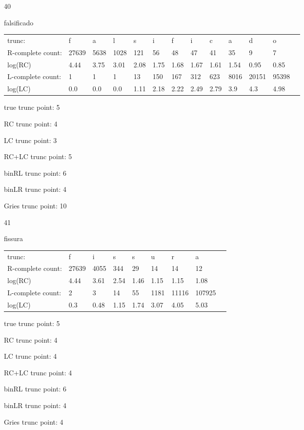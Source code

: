 \documentclass[10pt]{article}
\begin{document}
\vspace{1em}

40

falsificado

\begin{tabular}{l|llllllllllll}
trunc: & f & a & l & s & i & f & i & c & a & d & o & \\ 
R-complete count: & 27639 & 5638 & 1028 & 121 & 56 & 48 & 47 & 41 & 35 & 9 & 7 & \\ 
log(RC) & 4.44 & 3.75 & 3.01 & 2.08 & 1.75 & 1.68 & 1.67 & 1.61 & 1.54 & 0.95 & 0.85 & \\ 
L-complete count: & 1 & 1 & 1 & 13 & 150 & 167 & 312 & 623 & 8016 & 20151 & 95398 & \\ 
log(LC) & 0.0 & 0.0 & 0.0 & 1.11 & 2.18 & 2.22 & 2.49 & 2.79 & 3.9 & 4.3 & 4.98 & \\ 
\end{tabular}

true trunc point: 5

RC trunc point: 4

LC trunc point: 3

RC+LC trunc point: 5

binRL trunc point: 6

binLR trunc point: 4

Gries trunc point: 10

\newpage

41

fissura

\begin{tabular}{l|llllllll}
trunc: & f & i & s & s & u & r & a & \\ 
R-complete count: & 27639 & 4055 & 344 & 29 & 14 & 14 & 12 & \\ 
log(RC) & 4.44 & 3.61 & 2.54 & 1.46 & 1.15 & 1.15 & 1.08 & \\ 
L-complete count: & 2 & 3 & 14 & 55 & 1181 & 11116 & 107925 & \\ 
log(LC) & 0.3 & 0.48 & 1.15 & 1.74 & 3.07 & 4.05 & 5.03 & \\ 
\end{tabular}

true trunc point: 5

RC trunc point: 4

LC trunc point: 4

RC+LC trunc point: 4

binRL trunc point: 6

binLR trunc point: 4

Gries trunc point: 4
\end{document}
